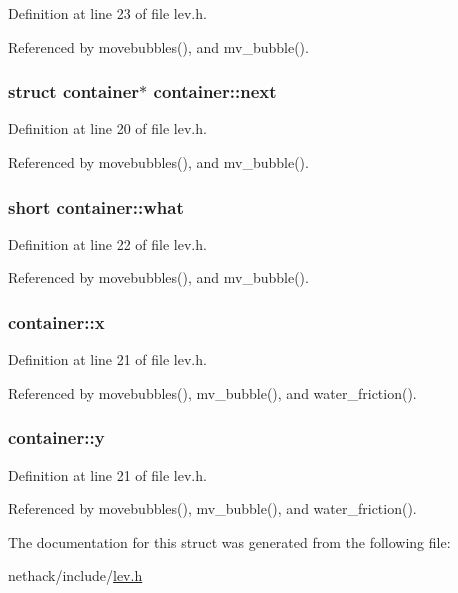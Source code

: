 Definition at line 23 of file lev.\+h.



Referenced by movebubbles(), and mv\+\_\+bubble().

\hypertarget{structcontainer_aa7dd898e9e1df84d3f1e647cbc76f266}{
\subsubsection[{next}]{\setlength{\rightskip}{0pt plus 5cm}struct {\bf container}$\ast$ container\+::next}}\label{structcontainer_aa7dd898e9e1df84d3f1e647cbc76f266}


Definition at line 20 of file lev.\+h.



Referenced by movebubbles(), and mv\+\_\+bubble().

\hypertarget{structcontainer_af31e1bce3abf7ac6d89534c778ed8f26}{
\subsubsection[{what}]{\setlength{\rightskip}{0pt plus 5cm}short container\+::what}}\label{structcontainer_af31e1bce3abf7ac6d89534c778ed8f26}


Definition at line 22 of file lev.\+h.



Referenced by movebubbles(), and mv\+\_\+bubble().

\hypertarget{structcontainer_a085a03de28c9473865182201317c2a27}{
\subsubsection[{x}]{ container\+::x}}\label{structcontainer_a085a03de28c9473865182201317c2a27}


Definition at line 21 of file lev.\+h.



Referenced by movebubbles(), mv\+\_\+bubble(), and water\+\_\+friction().

\hypertarget{structcontainer_a74c8505c048acb675a74441c1c3ccd61}{
\subsubsection[{y}]{ container\+::y}}\label{structcontainer_a74c8505c048acb675a74441c1c3ccd61}


Definition at line 21 of file lev.\+h.



Referenced by movebubbles(), mv\+\_\+bubble(), and water\+\_\+friction().



The documentation for this struct was generated from the following file\+:\begin{DoxyCompactItemize}
\item 
nethack/include/\hyperlink{lev_8h}{lev.\+h}\end{DoxyCompactItemize}
